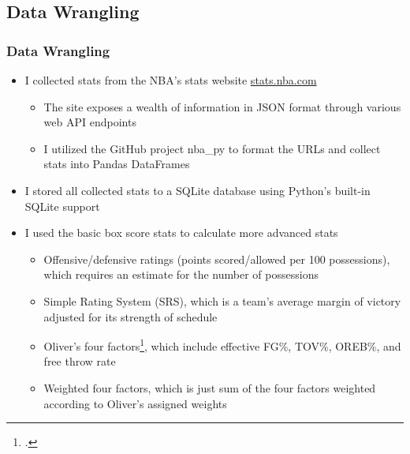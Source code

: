 \documentclass{beamer}
\begin{document}
\subsection{Data Wrangling}
\begin{frame}
\frametitle{Data Wrangling}
\begin{itemize}
    \item I collected stats from the NBA's stats website \url{stats.nba.com}
    \begin{itemize}
        \item The site exposes a wealth of information in JSON format through various web API endpoints
        \item I utilized the GitHub project nba\_py to format the URLs and collect stats into Pandas DataFrames
    \end{itemize}
    \item I stored all collected stats to a SQLite database using Python's built-in SQLite support
    \item I used the basic box score stats to calculate more advanced stats
    \begin{itemize}
        \item Offensive/defensive ratings (points scored/allowed per 100 possessions), which requires an estimate for the number of possessions
        \item Simple Rating System (SRS), which is a team's average margin of victory adjusted for its strength of schedule
        \item Oliver's four factors\footcite{oliver}, which include effective FG\%, TOV\%, OREB\%, and free throw rate
        \item Weighted four factors, which is just sum of the four factors weighted according to Oliver's assigned weights
    \end{itemize}
\end{itemize}
\end{frame}
\end{document}
